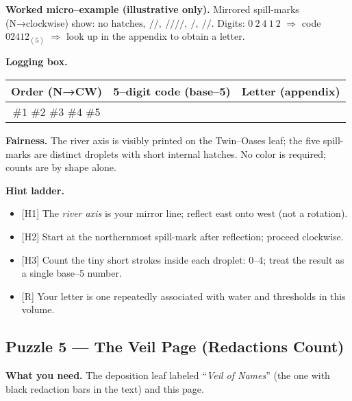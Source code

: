 \documentclass[11pt]{article}
\begin{document}
\begin{itemize}
\medskip
\noindent\textbf{Worked micro–example (illustrative only).}  
Mirrored spill-marks (N→clockwise) show: \(\text{no hatches},\ /\!\!/,\ /\!\!/\!\!/\!\!/,\ /,\ /\!\!/\).  
Digits: \(0\ 2\ 4\ 1\ 2\) \(\Rightarrow\) code \(02412_{(5)}\) \(\Rightarrow\) look up in the appendix to obtain a letter.

\medskip
\noindent\textbf{Logging box.}
\begin{center}
\begin{tabular}{c|c|c}
\textbf{Order (N→CW)} & \textbf{5–digit code (base–5)} & \textbf{Letter (appendix)} \\
\hline
\(\#1\) \(\#2\) \(\#3\) \(\#4\) \(\#5\) & \hspace{3.5cm} & \hspace{1.2cm} \\
\end{tabular}
\end{center}

\medskip
\noindent\textbf{Fairness.} The river axis is visibly printed on the Twin–Oases leaf; the five spill-marks are distinct droplets with short internal hatches. No color is required; counts are by shape alone.

\medskip
\noindent\textbf{Hint ladder.}
\begin{itemize}\setlength\itemsep{0.25em}
  \item \textsc{[H1]} The \emph{river axis} is your mirror line; reflect east onto west (not a rotation).
  \item \textsc{[H2]} Start at the northernmost spill-mark after reflection; proceed clockwise.
  \item \textsc{[H3]} Count the tiny short strokes inside each droplet: 0–4; treat the result as a single base–5 number.
  \item \textsc{[R]} Your letter is one repeatedly associated with water and thresholds in this volume.
\end{itemize}

\subsection{Puzzle 5 — The Veil Page (Redactions Count)}
\label{pz:veil-page}
{}

\noindent\textbf{What you need.} The deposition leaf labeled “\textit{Veil of Names}” (the one with black redaction bars in the text) and this page.


\end{itemize}
\end{document}
